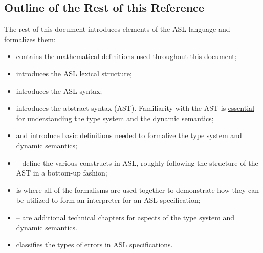 \subsection{Outline of the Rest of this Reference}
The rest of this document introduces elements of the ASL language
and formalizes them:
\begin{itemize}
    \item {} contains the mathematical definitions used
        throughout this document;
    \item {} introduces the ASL lexical structure;
    \item {} introduces the ASL syntax;
    \item {} introduces the abstract syntax (AST).
        Familiarity with the AST is \underline{essential} for understanding the
        type system and the dynamic semantics;
    \item {} and  introduce basic
        definitions needed to formalize the type system and dynamic semantics;
    \item {}--
        define the various constructs in ASL, roughly following the structure of the AST
        in a bottom-up fashion;
    \item {} is where all of the formalisms are used together to
        demonstrate how they can be utilized to form an interpreter for an ASL specification;
    \item {}-- are additional
        technical chapters for aspects of the type system and dynamic semantics.
    \item {} classifies the types of errors in ASL specifications.
\end{itemize}
